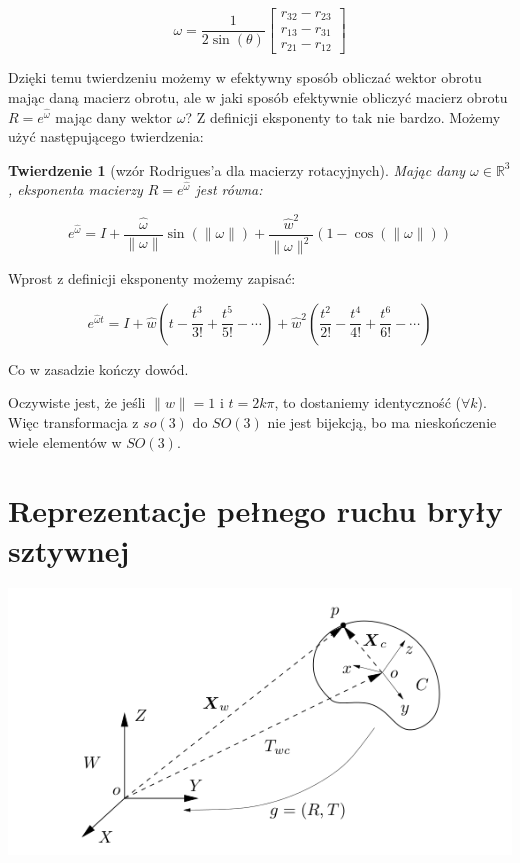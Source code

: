 \documentclass[a4paper,12pt]{article}
\newtheorem{theo}[defi]{Twierdzenie}
\newcommand{\RR}{\mathbb{R}^3}
\begin{document}
\begin{equation}
\omega = \frac{1}{2\sin(\theta)}
\begin{bmatrix}
  r_{32} - r_{23} \\ r_{13} - r_{31} \\ r_{21} - r_{12}
\end{bmatrix}
\end{equation}

Dzięki temu twierdzeniu możemy w efektywny sposób obliczać wektor obrotu mając daną macierz obrotu, ale w jaki sposób efektywnie obliczyć macierz obrotu $R = e^{\hat{\omega}}$ mając dany wektor $\omega$? Z definicji eksponenty to tak nie bardzo. Możemy użyć następującego twierdzenia:

\begin{theo}[wzór Rodrigues'a dla macierzy rotacyjnych]
Mając dany $\omega \in \RR$, eksponenta macierzy $R = e^{\hat{\omega}}$ jest równa:
\end{theo}

\begin{equation}
e^{\hat{\omega}}=I + \frac{\hat{\omega}}{\| \omega \|}\sin(\| \omega \|) + \frac{\hat{w}^2}{\| \omega \|^2}(1 - \cos(\| \omega \|))
\end{equation}

\noindent Wprost z definicji eksponenty możemy zapisać:

\begin{equation}
e^{\hat{\omega}t}= I + \hat{w}(t - \frac{t^3}{3!} + \frac{t^5}{5!} - \cdots) + \hat{w}^2(\frac{t^2}{2!} - \frac{t^4}{4!} + \frac{t^6}{6!} - \cdots)
\end{equation}

\noindent Co w zasadzie kończy dowód.

Oczywiste jest, że jeśli $\| w \|=1$ i $t=2k\pi$, to dostaniemy identyczność ($\forall k$). Więc transformacja z $so(3)$ do $SO(3)$ nie jest bijekcją, bo ma nieskończenie wiele elementów w $SO(3)$.


\section{Reprezentacje pełnego ruchu bryły sztywnej}

\begin{center}
\includegraphics[scale=0.5]{img/rys2.png}
\end{center}
\end{document}
